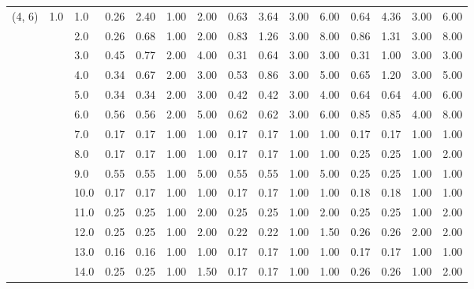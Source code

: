 \begin{tabular}{lllrrrrrrrrrrrr}
(4, 6) & 1.0 & 1.0  &       0.26 &      2.40 & 1.00 &   2.00 &       0.63 &      3.64 &  3.00 &   6.00 &       0.64 &      4.36 &  3.00 &   6.00 \\
       &     & 2.0  &       0.26 &      0.68 & 1.00 &   2.00 &       0.83 &      1.26 &  3.00 &   8.00 &       0.86 &      1.31 &  3.00 &   8.00 \\
       &     & 3.0  &       0.45 &      0.77 & 2.00 &   4.00 &       0.31 &      0.64 &  3.00 &   3.00 &       0.31 &      1.00 &  3.00 &   3.00 \\
       &     & 4.0  &       0.34 &      0.67 & 2.00 &   3.00 &       0.53 &      0.86 &  3.00 &   5.00 &       0.65 &      1.20 &  3.00 &   5.00 \\
       &     & 5.0  &       0.34 &      0.34 & 2.00 &   3.00 &       0.42 &      0.42 &  3.00 &   4.00 &       0.64 &      0.64 &  4.00 &   6.00 \\
       &     & 6.0  &       0.56 &      0.56 & 2.00 &   5.00 &       0.62 &      0.62 &  3.00 &   6.00 &       0.85 &      0.85 &  4.00 &   8.00 \\
       &     & 7.0  &       0.17 &      0.17 & 1.00 &   1.00 &       0.17 &      0.17 &  1.00 &   1.00 &       0.17 &      0.17 &  1.00 &   1.00 \\
       &     & 8.0  &       0.17 &      0.17 & 1.00 &   1.00 &       0.17 &      0.17 &  1.00 &   1.00 &       0.25 &      0.25 &  1.00 &   2.00 \\
       &     & 9.0  &       0.55 &      0.55 & 1.00 &   5.00 &       0.55 &      0.55 &  1.00 &   5.00 &       0.25 &      0.25 &  1.00 &   1.00 \\
       &     & 10.0 &       0.17 &      0.17 & 1.00 &   1.00 &       0.17 &      0.17 &  1.00 &   1.00 &       0.18 &      0.18 &  1.00 &   1.00 \\
       &     & 11.0 &       0.25 &      0.25 & 1.00 &   2.00 &       0.25 &      0.25 &  1.00 &   2.00 &       0.25 &      0.25 &  1.00 &   2.00 \\
       &     & 12.0 &       0.25 &      0.25 & 1.00 &   2.00 &       0.22 &      0.22 &  1.00 &   1.50 &       0.26 &      0.26 &  2.00 &   2.00 \\
       &     & 13.0 &       0.16 &      0.16 & 1.00 &   1.00 &       0.17 &      0.17 &  1.00 &   1.00 &       0.17 &      0.17 &  1.00 &   1.00 \\
       &     & 14.0 &       0.25 &      0.25 & 1.00 &   1.50 &       0.17 &      0.17 &  1.00 &   1.00 &       0.26 &      0.26 &  1.00 &   2.00 \\

\end{tabular}
